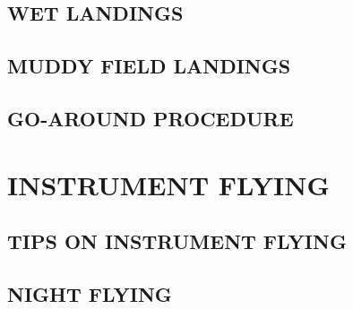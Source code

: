 \subsection{WET LANDINGS}
\subsection{MUDDY FIELD LANDINGS}
\subsection{GO-AROUND PROCEDURE}

\section{INSTRUMENT FLYING}
\subsection{TIPS ON INSTRUMENT FLYING}
\subsection{NIGHT FLYING}


\cleardoublepage{}